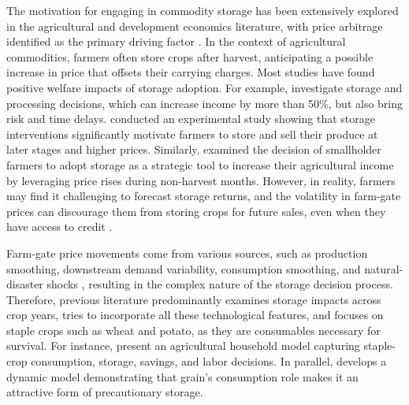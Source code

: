 
\noindent The motivation for engaging in commodity storage has been extensively explored in the agricultural and development economics literature, with price arbitrage identified as the primary driving factor \citep{helmberger1977welfare, wright1984welfare, deaton1992behaviour, miranda1996, wright1982econ,minten2014new}. In the context of agricultural commodities, farmers often store crops after harvest, anticipating a possible increase in price that offsets their carrying charges. Most studies have found positive welfare impacts of storage adoption. For example, \cite{ruhinduka2020smallholder} investigate storage and processing decisions, which can increase income by more than 50\%, but also bring risk and time delays. \cite{aggarwal2018grain} conducted an experimental study showing that storage interventions significantly motivate farmers to store and sell their produce at later stages and higher prices. Similarly, \cite{priya2020post} examined the decision of smallholder farmers to adopt storage as a strategic tool to increase their agricultural income by leveraging price rises during non-harvest months. However, in reality, farmers may find it challenging to forecast storage returns, and the volatility in farm-gate prices can discourage them from storing crops for future sales, even when they have access to credit \citep{cardell2023price}. 


Farm-gate price movements come from various sources, such as production smoothing, downstream demand variability, consumption smoothing, and natural-disaster shocks \citep{tomek2001risk, channa2022overcoming}, resulting in the complex nature of the storage decision process. Therefore, previous literature predominantly examines storage impacts across crop years, tries to incorporate all these technological features, and focuses on staple crops such as wheat and potato, as they are consumables necessary for survival. For instance, \cite{saha1994household} present an agricultural household model capturing staple-crop consumption, storage, savings, and labor decisions. In parallel, \cite{park2006risk} develops a dynamic model demonstrating that grain's consumption role makes it an attractive form of precautionary storage. 


